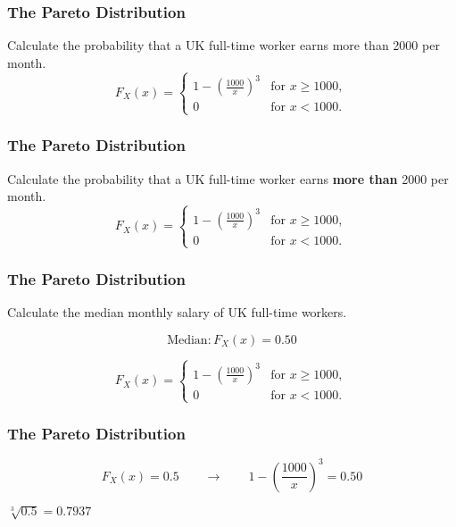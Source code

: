 \documentclass[IntroMain.tex]{subfiles}
\begin{document}
\begin{frame}
	\frametitle{The Pareto Distribution}
	\LARGE
	\vspace{-1.8cm}
	Calculate the probability that a UK full-time worker earns more than 2000 per month.
	{
		\Large
		\[
		F_X(x) = \begin{cases}
		1-\left(\frac{1000}{x}\right)^3 & \text{for } x \ge 1000, \\
		0 & \text{for }x < 1000.
		\end{cases}
		\]
	}
\end{frame}
\begin{frame}
	\frametitle{The Pareto Distribution}
	\LARGE
	\vspace{-1.8cm}
Calculate the probability that a UK full-time worker earns \alert{\textbf{more than}} 2000 per month.
{
	\Large
\[
F_X(x) = \begin{cases}
1-\left(\frac{1000}{x}\right)^3 & \text{for } x \ge 1000, \\
0 & \text{for }x < 1000.
\end{cases}
\]
}
\end{frame}
\begin{frame}
	\frametitle{The Pareto Distribution}
	\LARGE
	\vspace{-1.2cm}
Calculate the median monthly salary of UK full-time workers.

\[ \mbox{Median}: F_X(x) = 0.50\]

{
	\LARGE
	\[
	F_X(x) = \begin{cases}
	1-\left(\frac{1000}{x}\right)^3 & \text{for } x \ge 1000, \\
	0 & \text{for }x < 1000.
	\end{cases}
	\]
}

\end{frame}
\begin{frame}
	\frametitle{The Pareto Distribution}
	\LARGE
	\vspace{-3.2cm}
	
	\[ F_X(x) = 0.5 \qquad \rightarrow \qquad 1-\left(\frac{1000}{x}\right)^3 = 0.50\]

\vspace{2.2cm}

$ \sqrt[3]{0.5} = 0.7937 $


\end{frame}
\end{document}
